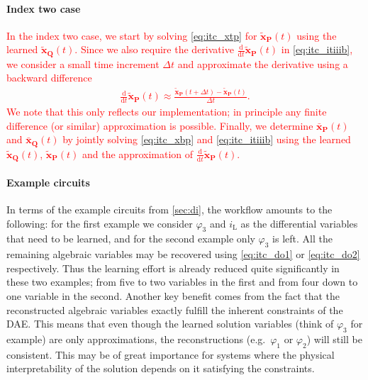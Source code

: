 \documentclass[AMA,STIX1COL]{WileyNJD-v2}
\newcommand{\mb}[1]{\mathbf{#1}}
\newcommand{\mbt}[1]{\tilde{\mathbf{#1}}}
\newcommand{\mbb}[1]{\bar{\mathbf{#1}}}
\newcommand{\mr}[1]{\mathrm{#1}}
\newcommand{\ddt}{\frac{\mathrm{d}}{\mathrm{d}t}}
\begin{document}
\paragraph{Index two case}
\textcolor{red}{In the index two case, we start by solving \eqref{eq:itc_xtp} for $\mbt{x}_\mb{P}(t)$ using the learned $\mbt{x}_\mb{Q}(t)$. Since we also require the derivative $\ddt \mbt{x}_\mb{P}(t)$ in \eqref{eq:itc_itiiib}, we consider a small time increment $\Delta t$ and approximate the derivative using a backward difference
\begin{align*}
    \ddt \mbt{x}_\mb{P}(t) \approx \frac{\mbt{x}_\mb{P}(t + \Delta t) - \mbt{x}_\mb{P}(t)}{\Delta t}.
\end{align*}
We note that this only reflects our implementation; in principle any finite difference (or similar) approximation is possible. Finally, we determine $\mbb{x}_\mb{P}(t)$ and $\mbb{x}_\mb{Q}(t)$ by jointly solving \eqref{eq:itc_xbp} and \eqref{eq:itc_itiiib} using the learned $\mbt{x}_\mb{Q}(t)$, $\mbt{x}_\mb{P}(t)$ and the approximation of $\ddt \mbt{x}_\mb{P}(t)$.}

\paragraph{Example circuits}
In terms of the example circuits from \autoref{sec:di}, the workflow amounts to the following: for the first example we consider $\varphi_3$ and $i_\mr{L}$ as the differential variables that need to be learned, and for the second example only $\varphi_3$ is left. All the remaining algebraic variables may be recovered using \eqref{eq:itc_do1} or \eqref{eq:itc_do2} respectively. Thus the learning effort is already reduced quite significantly in these two examples; from five to two variables in the first and from four down to one variable in the second. Another key benefit comes from the fact that the reconstructed algebraic variables exactly fulfill the inherent constraints of the DAE. This means that even though the learned solution variables (think of $\varphi_3$ for example) are only approximations, the reconstructions (e.g.~$\varphi_1$ or $\varphi_2$) will still be consistent. This may be of great importance for systems where the physical interpretability of the solution depends on it satisfying the constraints.
\end{document}
